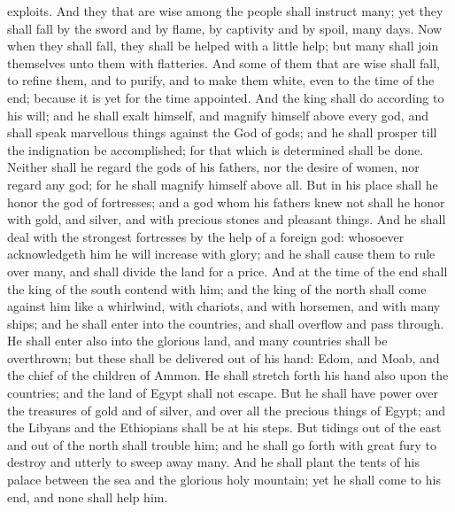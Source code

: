 exploits. And they that are wise among the people shall instruct many; yet they shall fall by the sword and by flame, by captivity and by spoil, many days. Now when they shall fall, they shall be helped with a little help; but many shall join themselves unto them with flatteries. And some of them that are wise shall fall, to refine them, and to purify, and to make them white, even to the time of the end; because it is yet for the time appointed.  And the king shall do according to his will; and he shall exalt himself, and magnify himself above every god, and shall speak marvellous things against the God of gods; and he shall prosper till the indignation be accomplished; for that which is determined shall be done. Neither shall he regard the gods of his fathers, nor the desire of women, nor regard any god; for he shall magnify himself above all. But in his place shall he honor the god of fortresses; and a god whom his fathers knew not shall he honor with gold, and silver, and with precious stones and pleasant things. And he shall deal with the strongest fortresses by the help of a foreign god: whosoever acknowledgeth him he will increase with glory; and he shall cause them to rule over many, and shall divide the land for a price.  And at the time of the end shall the king of the south contend with him; and the king of the north shall come against him like a whirlwind, with chariots, and with horsemen, and with many ships; and he shall enter into the countries, and shall overflow and pass through. He shall enter also into the glorious land, and many countries shall be overthrown; but these shall be delivered out of his hand: Edom, and Moab, and the chief of the children of Ammon. He shall stretch forth his hand also upon the countries; and the land of Egypt shall not escape. But he shall have power over the treasures of gold and of silver, and over all the precious things of Egypt; and the Libyans and the Ethiopians shall be at his steps. But tidings out of the east and out of the north shall trouble him; and he shall go forth with great fury to destroy and utterly to sweep away many. And he shall plant the tents of his palace between the sea and the glorious holy mountain; yet he shall come to his end, and none shall help him. 

